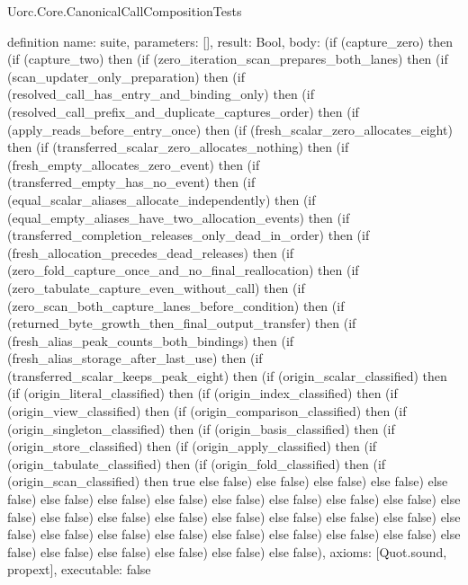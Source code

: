 \begin{lexlean}{Uorc.Core.CanonicalCallCompositionTests}
\begin{semanticmodule}
definition{
  name: suite,
  parameters: [],
  result: Bool,
  body: (if (capture_zero) then (if (capture_two) then (if (zero_iteration_scan_prepares_both_lanes) then (if (scan_updater_only_preparation) then (if (resolved_call_has_entry_and_binding_only) then (if (resolved_call_prefix_and_duplicate_captures_order) then (if (apply_reads_before_entry_once) then (if (fresh_scalar_zero_allocates_eight) then (if (transferred_scalar_zero_allocates_nothing) then (if (fresh_empty_allocates_zero_event) then (if (transferred_empty_has_no_event) then (if (equal_scalar_aliases_allocate_independently) then (if (equal_empty_aliases_have_two_allocation_events) then (if (transferred_completion_releases_only_dead_in_order) then (if (fresh_allocation_precedes_dead_releases) then (if (zero_fold_capture_once_and_no_final_reallocation) then (if (zero_tabulate_capture_even_without_call) then (if (zero_scan_both_capture_lanes_before_condition) then (if (returned_byte_growth_then_final_output_transfer) then (if (fresh_alias_peak_counts_both_bindings) then (if (fresh_alias_storage_after_last_use) then (if (transferred_scalar_keeps_peak_eight) then (if (origin_scalar_classified) then (if (origin_literal_classified) then (if (origin_index_classified) then (if (origin_view_classified) then (if (origin_comparison_classified) then (if (origin_singleton_classified) then (if (origin_basis_classified) then (if (origin_store_classified) then (if (origin_apply_classified) then (if (origin_tabulate_classified) then (if (origin_fold_classified) then (if (origin_scan_classified) then true else false) else false) else false) else false) else false) else false) else false) else false) else false) else false) else false) else false) else false) else false) else false) else false) else false) else false) else false) else false) else false) else false) else false) else false) else false) else false) else false) else false) else false) else false) else false) else false) else false) else false),
  axioms: [Quot.sound, propext],
  executable: false
}
\end{semanticmodule}
\end{lexlean}
